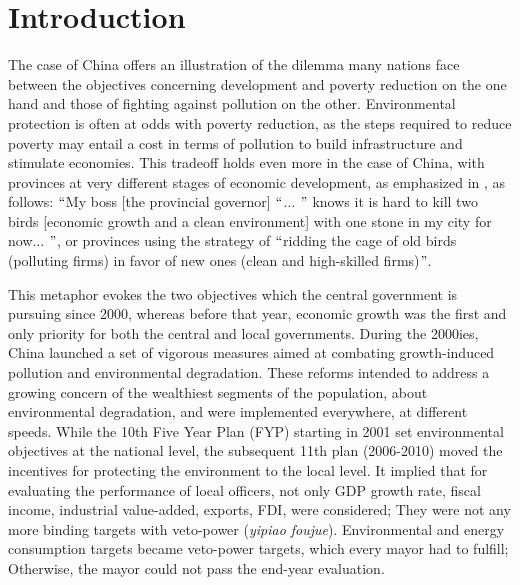 \documentclass[12pt]{article}
\begin{document}
\doublespacing

\section{Introduction }

The case of China offers an illustration of the dilemma many nations face between the objectives concerning development and poverty reduction on the one hand and those of fighting against pollution on the other. Environmental protection is often at odds with poverty reduction, as the steps required to reduce poverty may entail a cost in terms of pollution to build infrastructure and stimulate economies. This tradeoff holds even more in the case of China, with provinces at very different stages of economic development, as emphasized in \citet[p.196 and p.198]{Kahn2016-fi}, as follows: $``$My boss [the provincial governor] $``$$ \ldots $ $"$  knows it is hard to kill two birds [economic growth and a clean environment] with one stone in my city for now$ \ldots $ $"$, or provinces using the strategy of $``$ridding the cage of old birds (polluting firms) in favor of new ones (clean and high-skilled firms)$"$.



This metaphor evokes the two objectives which the central government is pursuing since 2000, whereas before that year, economic growth was the first and only priority for both the central and local governments. During the 2000ies, China launched a set of vigorous measures aimed at combating growth-induced pollution and environmental degradation. These reforms intended to address a growing concern of the wealthiest segments of the population, about environmental degradation, and were implemented everywhere, at different speeds. While the 10th Five Year Plan (FYP) starting in 2001 set environmental objectives at the national level, the subsequent 11th plan (2006-2010) moved the incentives for protecting the environment to the local level. It implied that for evaluating the performance of local officers, not only GDP growth rate, fiscal income, industrial value-added, exports, FDI, were considered; They were not any more binding targets with veto-power (\textit{yipiao foujue}). Environmental and energy consumption targets became veto-power targets, which every mayor had to fulfill; Otherwise, the mayor could not pass the end-year evaluation. 
\end{document}
